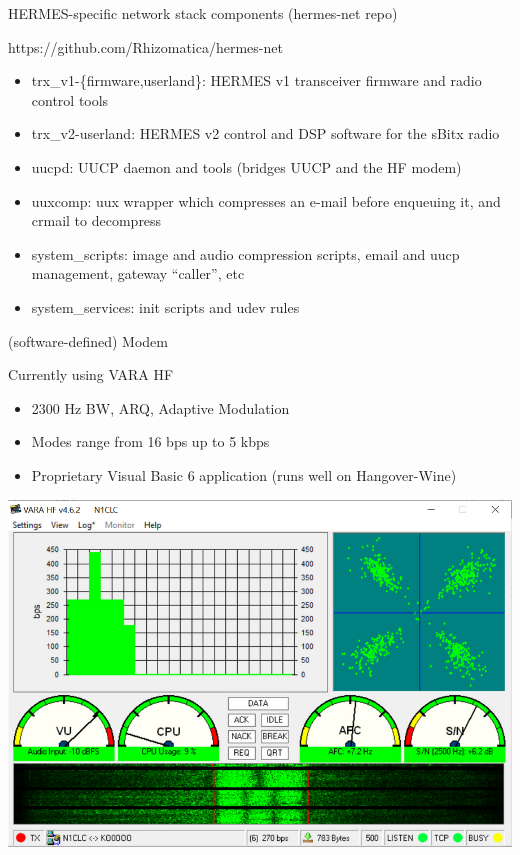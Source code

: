 \documentclass[aspectratio=169,xcolor={x11names,svgnames,dvipsnames}]{beamer}
\begin{document}
\begin{frame}{HERMES-specific network stack components (hermes-net repo)}

\begin{block}{https://github.com/Rhizomatica/hermes-net}
    \begin{itemize}
    \item trx\_v1-\{firmware,userland\}: HERMES v1 transceiver firmware and radio control tools
    \item trx\_v2-userland: HERMES v2 control and DSP software for the sBitx radio
    \item uucpd: UUCP daemon and tools (bridges UUCP and the HF modem)
    \item uuxcomp: uux wrapper which compresses an e-mail before enqueuing it, and crmail to decompress
    \item system\_scripts: image and audio compression scripts, email and uucp management, gateway ``caller'', etc
    \item system\_services: init scripts and udev rules
    \end{itemize}
  \end{block}

\end{frame}




\begin{frame}{(software-defined) Modem}

\begin{block}{Currently using VARA HF}
    \begin{itemize}
    \item 2300 Hz BW, ARQ, Adaptive Modulation
    \item Modes range from 16 bps up to 5 kbps
    \item Proprietary Visual Basic 6 application (runs well on Hangover-Wine)
    \end{itemize}
  \end{block}

\begin{center}
  \vspace{-0.15cm}\includegraphics[width=.42\columnwidth]{vara.png}
\end{center}

\end{frame}
\end{document}
